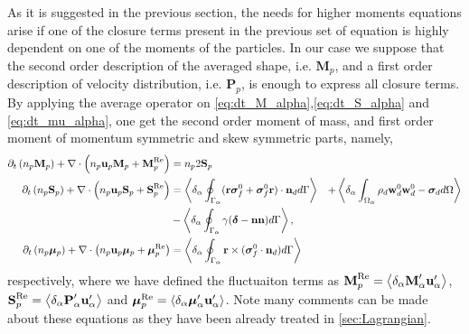 As it is suggested in the previous section, the needs for higher moments equations arise if one of the closure terms present in the previous set of equation is highly dependent on one of the moments of the particles. 
In our case we suppose that the second order description of the averaged shape, i.e. $\textbf{M}_p$, and a first order description of velocity distribution, i.e. $\textbf{P}_p$,  is enough to express all closure terms. 
By applying the average operator on \ref{eq:dt_M_alpha},\ref{eq:dt_S_alpha} and \ref{eq:dt_mu_alpha}, one get the second order moment of mass, and first order moment of momentum symmetric and skew symmetric parts, namely, 
\begin{align}
    \partial_t \left(n_p \textbf{M}_p\right)
    + \mathbf{\nabla}\cdot \left(
        n_p \textbf{u}_p \textbf{M}_p
    + \textbf{M}_p^\text{Re}
    \right)
    &=
    n_p2  \textbf{S}_p
    \label{eq:dt_hybrid_Mp}
    \\
\label{eq:dt_hybrid_Sp}
\partial_t \left(n_p \textbf{S}_p\right)
+ \mathbf{\nabla}\cdot \left(
    n_p \textbf{u}_p \textbf{S}_p
+ \textbf{S}_p^\text{Re}
\right)
&=
\left<\delta_\alpha \oint_{\Gamma_\alpha} (\textbf{r}\bm\sigma_f^0+\bm\sigma_f^0\textbf{r})\cdot \textbf{n}_d d\Gamma\right>
&+ \left<\delta_\alpha \int_{\Omega_\alpha} 
    \rho_d \textbf{w}_d^0  \textbf{w}_d^0 
    - \bm{\sigma}_d
 d\Omega\right>\\
&-  \left<\delta_\alpha \oint_{\Gamma_\alpha} \gamma (\bm\delta - \textbf{nn}) d\Gamma\right>,
\\
\label{eq:dt_hybrid_mup}
\partial_t \left(n_p \bm{\mu}_p\right)
+ \mathbf{\nabla}\cdot \left(
n_p \textbf{u}_p \bm{\mu}_p
+ \bm{\mu}_p^\text{Re}
\right)
&=
\left<\delta_\alpha \oint_{\Gamma_\alpha} \textbf{r}\times(\bm\sigma_f^0\cdot \textbf{n}_d) d\Gamma\right>
\end{align}
respectively, where we have defined the fluctuaiton terms as $
 \textbf{M}_p^\text{Re}
 = \left<\delta_\alpha \textbf{M}_\alpha' \textbf{u}_\alpha'\right> $,  $ 
 \textbf{S}_p^\text{Re}
 = \left<\delta_\alpha \textbf{P}_\alpha' \textbf{u}_\alpha'\right>$ and $ 
 \bm{\mu}_p^\text{Re}
 = \left<\delta_\alpha \bm{\mu}_\alpha' \textbf{u}_\alpha'\right>
$.
Note many comments can be made about these equations as they have been already treated in \ref{sec:Lagrangian}. 
